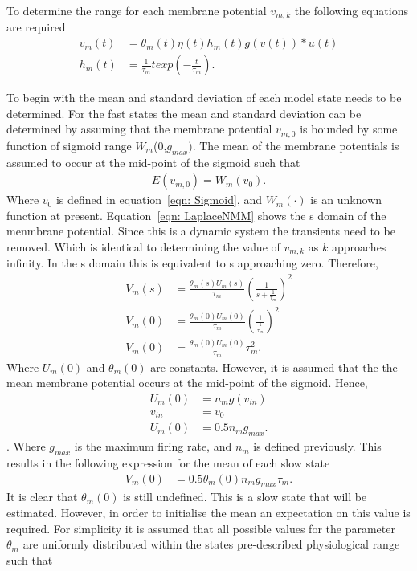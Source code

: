 To determine the range for each membrane potential $v_{m,k}$ the following equations are required \begin{align} %
\label{eqn: Convert2}
v_{m}(t) &= \theta_{m}(t)\eta(t)h_{m}(t)g(v(t))*u(t)\\
\label{eqn: Kernel2} 
h_{m}(t) &= \frac{1}{\tau_{m}}texp\left(-\frac{t}{\tau_{m}}\right). \end{align}

To begin with the mean and standard deviation of each model state needs to be determined. For the fast states the mean and standard deviation can be determined by assuming that the membrane potential $v_{m,0}$ is bounded by some function of sigmoid range $W_{m}$($0$,$g_{max})$. The mean of the membrane potentials is assumed to occur at the mid-point of the sigmoid such that \begin{align}
E(v_{m,0}) = W_{m}(v_{0}). \end{align} Where $v_{0}$ is defined in equation~\ref{eqn: Sigmoid}, and $W_{m}(\cdot)$ is an unknown function at present. Equation~\ref{eqn: LaplaceNMM} shows the s domain of the menmbrane potential. Since this is a dynamic system the transients need to be removed. Which is identical to determining the value of $v_{m,k}$ as $k$ approaches infinity. In the s domain this is equivalent to s approaching zero. Therefore, \begin{align}
V_{m}(s) &= \frac{\theta_{m}(s)U_{m}(s)}{\tau_{m}}\left(\frac{1}{s+\frac{1}{\tau_{m}}}\right)^2\\
V_{m}(0) &= \frac{\theta_{m}(0)U_{m}(0)}{\tau_{m}}\left(\frac{1}{\frac{1}{\tau_{m}}}\right)^2\\
\label{eqn: GeneralCalc}
V_{m}(0) &= \frac{\theta_{m}(0)U_{m}(0)}{\tau_{m}}\tau^2_{m}. \end{align} Where $U_{m}(0)$ and $\theta_{m}(0)$ are constants. However, it is assumed that the the mean membrane potential occurs at the mid-point of the sigmoid. Hence, \begin{align}%
U_{m}(0) &= n_{m}g(v_{in})\\
v_{in} &= v_{0}\\
U_{m}(0) &= 0.5n_{m}g_{max}.
\end{align}. Where $g_{max}$ is the maximum firing rate, and $n_m$ is defined previously. This results in the following expression for the mean of each slow state \begin{align} %
V_{m}(0) &= 0.5\theta_{m}(0)n_{m}g_{max}\tau_{m}.\end{align} It is clear that $\theta_{m}(0)$ is still undefined. This is a slow state that will be estimated. However, in order to initialise the mean an expectation on this value is required. For simplicity it is assumed that all possible values for the parameter $\theta_{m}$ are uniformly distributed within the states pre-described physiological range such that \begin{align}%

\end{align}
